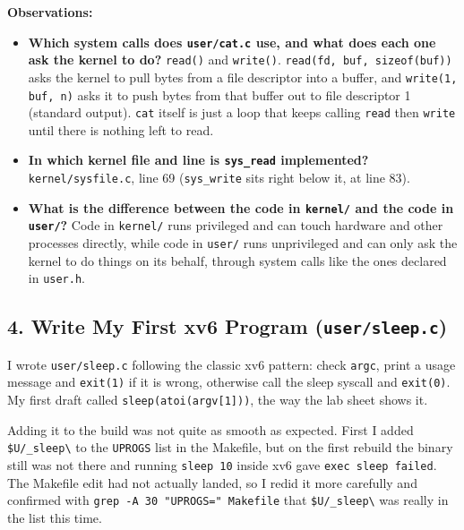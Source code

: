 \noindent\textbf{Observations:}
\begin{itemize}
  \item \textbf{Which system calls does \texttt{user/cat.c} use, and what does
        each one ask the kernel to do?} \texttt{read()} and \texttt{write()}.
        \texttt{read(fd, buf, sizeof(buf))} asks the kernel to pull bytes from
        a file descriptor into a buffer, and \texttt{write(1, buf, n)} asks it
        to push bytes from that buffer out to file descriptor 1 (standard
        output). \texttt{cat} itself is just a loop that keeps calling
        \texttt{read} then \texttt{write} until there is nothing left to read.
  \item \textbf{In which kernel file and line is \texttt{sys\_read}
        implemented?} \texttt{kernel/sysfile.c}, line 69 (\texttt{sys\_write}
        sits right below it, at line 83).
  \item \textbf{What is the difference between the code in \texttt{kernel/} and
        the code in \texttt{user/}?} Code in \texttt{kernel/} runs privileged
        and can touch hardware and other processes directly, while code in
        \texttt{user/} runs unprivileged and can only ask the kernel to do
        things on its behalf, through system calls like the ones declared in
        \texttt{user.h}.
\end{itemize}

\subsection*{4. Write My First xv6 Program (\texttt{user/sleep.c})}

\hspace{0.8cm} I wrote \texttt{user/sleep.c} following the classic xv6 pattern:
check \texttt{argc}, print a usage message and \texttt{exit(1)} if it is wrong,
otherwise call the sleep syscall and \texttt{exit(0)}. My first draft called
\texttt{sleep(atoi(argv[1]))}, the way the lab sheet shows it.

\hspace{0.8cm} Adding it to the build was not quite as smooth as expected.
First I added \texttt{\$U/\_sleep\textbackslash} to the \texttt{UPROGS} list in
the Makefile, but on the first rebuild the binary still was not there and
running \texttt{sleep 10} inside xv6 gave \texttt{exec sleep failed}. The
Makefile edit had not actually landed, so I redid it more carefully and
confirmed with \texttt{grep -A 30 "UPROGS=" Makefile} that
\texttt{\$U/\_sleep\textbackslash} was really in the list this time.

